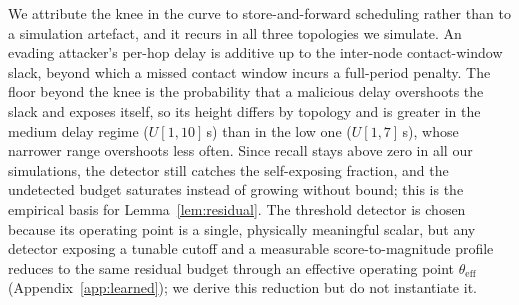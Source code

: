 \documentclass[conference,letterpaper,10pt]{IEEEtran}   %
\begin{document}
We attribute the knee in the curve to store-and-forward scheduling rather than
to a simulation artefact, and it recurs in all three topologies we simulate. An evading attacker's per-hop delay is additive up to the
inter-node contact-window slack, beyond which a missed contact window incurs a
full-period penalty. The floor beyond the knee is the probability that a
malicious delay overshoots the slack and exposes itself, so its height differs
by topology and is greater in the medium delay regime ($U[1,10]$\,s) than in the
low one ($U[1,7]$\,s), whose narrower range overshoots less often. Since recall
stays above zero in all our simulations, the detector still catches the
self-exposing fraction, and
the undetected budget saturates instead of growing without bound; this is the
empirical basis for Lemma~\ref{lem:residual}. The threshold detector is chosen
because its operating point is a single, physically meaningful scalar, but any
detector exposing a tunable cutoff and a measurable score-to-magnitude profile
reduces to the same residual budget through an effective operating point
$\theta_{\mathrm{eff}}$ (Appendix~\ref{app:learned}); we derive this reduction
but do not instantiate it.
\end{document}
